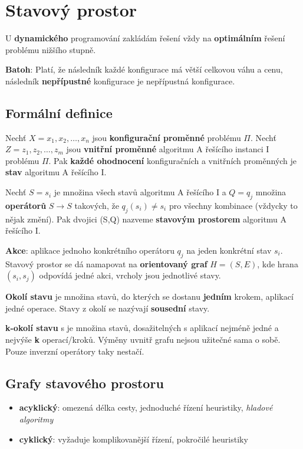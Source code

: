 \section{Stavový prostor}

U \textbf{dynamického} programování zakládám řešení vždy na \textbf{optimálním} řešení problému nižšího stupně.

\textbf{Batoh}: Platí, že následník každé konfigurace má větší celkovou váhu a cenu, následník \textbf{nepřípustné} konfigurace je nepřípustná konfigurace.

\subsection{Formální definice}
Nechť $X = {x_1, x_2, \ldots, x_n}$ jsou \textbf{konfigurační proměnné} problému $\Pi$. Nechť $Z = {z_1, z_2, \ldots, z_m}$ jsou \textbf{vnitřní proměnné} algoritmu A řešícího instanci I problému $\Pi$. Pak \textbf{každé ohodnocení} konfiguračních a vnitřních proměnných je \textbf{stav} algoritmu A řešícího I.

Nechť $S = {s_i}$ je množina všech stavů algoritmu A řešícího I a $Q = {q_j}$ množina \textbf{operátorů} $S \to S$ takových, že $q_j(s_i) \neq s_i$ pro všechny kombinace (vždycky to nějak změní). Pak dvojici (S,Q) nazveme \textbf{stavovým prostorem} algoritmu A řešícího I.

\textbf{Akce}: aplikace jednoho konkrétního operátoru $q_j$ na jeden konkrétní stav $s_i$. Stavový prostor se dá namapovat na \textbf{orientovaný graf} $H=(S,E)$, kde hrana $(s_i, s_j)$ odpovídá jedné akci, vrcholy jsou jednotlivé stavy.

\textbf{Okolí stavu} je množina stavů, do kterých se dostanu \textbf{jedním} krokem, aplikací jedné operace. Stavy z okolí se nazývají \textbf{sousední} stavy.

\textbf{k-okolí stavu} s je množina stavů, dosažitelných s aplikací nejméně jedné a nejvýše \textbf{k} operací/kroků. Výměny uvnitř grafu nejsou užitečné sama o sobě. Pouze inverzní operátory taky nestačí.

\subsection{Grafy stavového prostoru}

\begin{itemize}
    \item \textbf{acyklický}: omezená délka cesty, jednoduché řízení heuristiky, \textit{hladové algoritmy}
    \item \textbf{cyklický}: vyžaduje komplikovanější řízení, pokročilé heuristiky
\end{itemize}

